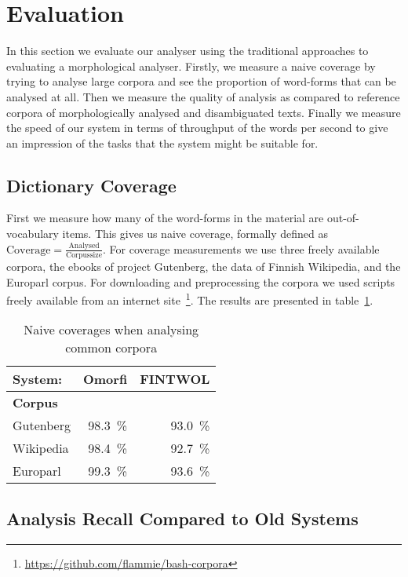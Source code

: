 \documentclass[a4paper,12pt]{article}
\begin{document}
\section{Evaluation}
\label{sec:evaluation}

In this section we evaluate our analyser using the traditional approaches to
evaluating a morphological analyser. Firstly, we measure a naive coverage by
trying to analyse large corpora and see the proportion of word-forms that can
be analysed at all. Then we measure the quality of analysis as compared to
reference corpora of morphologically analysed and disambiguated texts. Finally
we measure the speed of our system in terms of throughput of the words per
second to give an impression of the tasks that the system might be suitable
for.

\subsection{Dictionary Coverage}

First we measure how many of the word-forms in the material are
out-of-vocabulary items. This gives us naive coverage, formally defined as
$\mathrm{Coverage} = \frac{\mathrm{Analysed}}{\mathrm{Corpus size}}$. For
coverage measurements we use three freely available corpora, the ebooks of
project Gutenberg, the data of Finnish Wikipedia, and the Europarl corpus. For
downloading and preprocessing the corpora we used scripts freely available from
an internet site~\footnote{\url{https://github.com/flammie/bash-corpora}}. The
results are presented in table~\ref{table:coverage}. 

\begin{table}
    \centering
    \begin{tabular}{|l|r|r|}
        \hline
        \bf System: & Omorfi & FINTWOL \\
        \hline
        \bf Corpus & & \\
        \hline
        Gutenberg & 98.3~\% & 93.0~\%   \\
        Wikipedia & 98.4~\% & 92.7~\% \\
        Europarl  & 99.3~\% & 93.6~\% \\
        \hline
    \end{tabular}
    \caption{Naive coverages when analysing common corpora
    \label{table:coverage}}
\end{table}

\subsection{Analysis Recall Compared to Old Systems}
\end{document}

